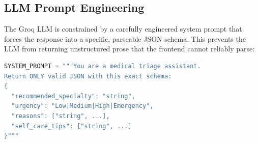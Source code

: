 \subsection{LLM Prompt Engineering}
The Groq LLM is constrained by a carefully engineered system prompt that forces the response into a specific, parseable JSON schema. This prevents the LLM from returning unstructured prose that the frontend cannot reliably parse:

\begin{lstlisting}[language=Python, caption=System prompt for Groq LLM]
SYSTEM_PROMPT = """You are a medical triage assistant.
Return ONLY valid JSON with this exact schema:
{
  "recommended_specialty": "string",
  "urgency": "Low|Medium|High|Emergency",
  "reasons": ["string", ...],
  "self_care_tips": ["string", ...]
}"""
\end{lstlisting}
